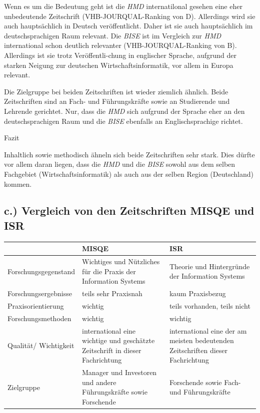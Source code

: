 \documentclass[12pt,utf8]{scrartcl}
\begin{document}
\begin{flushleft}
Wenn es um die Bedeutung geht ist die \emph{HMD} internatilonal gesehen eine eher unbedeutende Zeitschrift (VHB-JOURQUAL-Ranking von D)\cite{VHBJ}. Allerdings wird sie auch hauptsächlich in Deutsch veröffentlicht. Daher ist sie auch hauptsächlich im deutschsprachigen Raum relevant. 
Die \emph{BISE} ist im Vergleich zur \emph{HMD} international schon deutlich relevanter (VHB-JOURQUAL-Ranking von B)\cite{VHBJ}. Allerdings ist sie trotz Veröffentli-chung in englischer Sprache, aufgrund der starken Neigung zur deutschen Wirtschaftsinformatik, vor allem in Europa relevant. 

Die Zielgruppe bei beiden Zeitschriften ist wieder ziemlich ähnlich. Beide Zeitschriften sind an Fach- und Führungskräfte sowie an Studierende und Lehrende gerichtet. Nur, dass die \emph{HMD} sich aufgrund der Sprache eher an den deutschsprachigen Raum und die \emph{BISE} ebenfalls an Englischsprachige richtet.
\newline
\newline

{\Large Fazit}

Inhaltlich sowie methodisch ähneln sich beide Zeitschriften sehr stark. Dies dürfte vor allem daran liegen, dass die \emph{HMD} und die \emph{BISE} sowohl aus dem selben Fachgebiet (Wirtschaftsinformatik) als auch aus der selben Region (Deutschland) kommen.

\subsection*{\label{sub3:einfuehrung}c.) Vergleich von den Zeitschriften MISQE und ISR}

\begin{tabular}{|p{4cm}|p{5.5cm}|p{5.5cm}|}
\hline
& MISQE & ISR \\
\hline
Forschungsgegenstand & Wichtiges und Nützliches für die Praxis der Information Systems & Theorie und Hintergründe der Information Systems \\
\hline
Forschungsergebnisse & teils sehr Praxisnah & kaum Praxisbezug \\
\hline
Praxisorientierung & wichtig & teils vorhanden, teils nicht \\
\hline
Forschungsmethoden & wichtig & wichtig \\
\hline
Qualität/ Wichtigkeit & international eine wichtige und geschätzte Zeitschrift in dieser Fachrichtung & international eine der am meisten bedeutenden Zeitschriften dieser Fachrichtung \\
\hline
Zielgruppe & Manager und Investoren und andere Führungskräfte sowie Forschende & Forschende sowie Fach- und Führungskräfte \\
\hline
\end{tabular}
\newline
\newline
\newline


\end{flushleft}
\end{document}
